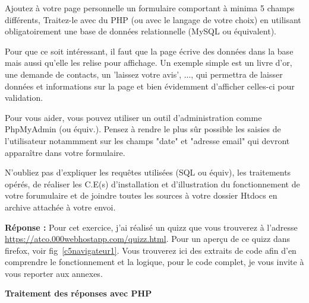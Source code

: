 \documentclass[11pt]{article}
\begin{document}
Ajoutez à votre page personnelle un formulaire comportant à minima 5 champs différents, Traitez-le avec du PHP (ou avec le langage de votre choix) en utilisant obligatoirement une base de données relationnelle (MySQL ou équivalent).

Pour que ce soit intéressant, il faut que la page écrive des données dans la base mais aussi qu’elle les relise pour affichage. Un exemple simple est un livre d’or, une demande de contacts, un ’laissez votre avis’, ..., qui permettra de laisser données et informations sur la page et bien évidemment d’afficher celles-ci pour validation.

Pour vous aider, vous pouvez utiliser un outil d’administration comme PhpMyAdmin (ou équiv.). Pensez à rendre le plus sûr possible les saisies de l’utilisateur notammment sur les champs "date" et "adresse email" qui devront apparaître dans votre formulaire.

N’oubliez pas d’expliquer les requêtes utilisées (SQL ou équiv), les traitements opérés, de réaliser les C.E(s) d’installation et d’illustration du fonctionnement de votre forumulaire et de joindre toutes les sources à votre dossier Htdocs en archive attachée à votre envoi.

\textbf{Réponse :} Pour cet exercice, j’ai réalisé un quizz que vous trouverez à l’adresse \url{https://atco.000webhostapp.com/quizz.html}. Pour un aperçu de ce quizz dans firefox, voir fig~\ref{c5navigateur1}. Vous trouverez ici des extraits de code afin d’en comprendre le fonctionnement et la logique, pour le code complet, je vous invite à vous reporter aux annexes.

\textbf{Traitement des réponses avec PHP}
\end{document}
